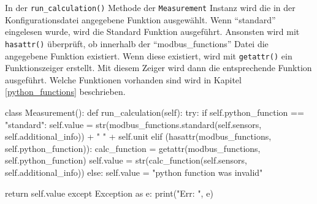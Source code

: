 In der \lstinline{run_calculation()} Methode der \lstinline{Measurement} Instanz wird die in der Konfigurationsdatei angegebene Funktion ausgewählt. Wenn \enquote{standard} eingelesen wurde, wird die Standard Funktion ausgeführt. Ansonsten wird mit \lstinline{hasattr()} überprüft, ob innerhalb der \enquote{modbus\_functions} Datei die angegebene Funktion existiert. Wenn diese existiert, wird mit \lstinline{getattr()} ein Funktionszeiger erstellt. Mit diesem Zeiger wird dann die entsprechende Funktion ausgeführt. Welche Funktionen vorhanden sind wird in Kapitel \ref{python_functions} beschrieben. 

\begin{pythoncode}
class Measurement():
	def run_calculation(self):
		try:
			if self.python_function == "standard":
				self.value = str(modbus_functions.standard(self.sensors, self.additional_info)) + " " + self.unit
			elif (hasattr(modbus_functions, self.python_function)):
				calc_function = getattr(modbus_functions, self.python_function)
				self.value = str(calc_function(self.sensors, self.additional_info))
			else:
				self.value = "python function was invalid"
		
			return self.value
		except Exception as e:
			print("Err: ", e)
\end{pythoncode}